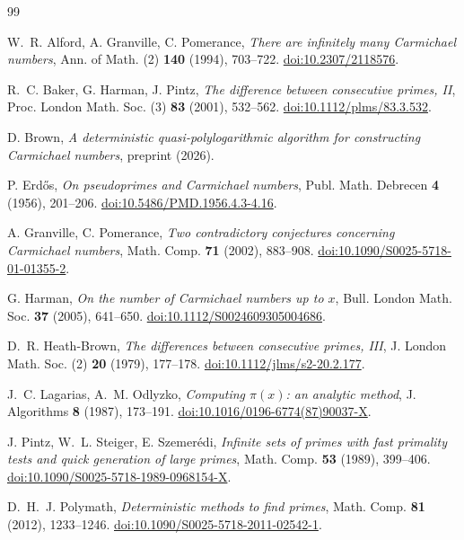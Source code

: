 \documentclass[11pt]{amsart}
\begin{document}
\begin{thebibliography}{99}

 W.~R. Alford, A. Granville, C. Pomerance,
\emph{There are infinitely many Carmichael numbers},
Ann. of Math. (2) \textbf{140} (1994), 703--722.
\href{https://doi.org/10.2307/2118576}{doi:10.2307/2118576}.

 R.~C. Baker, G. Harman, J. Pintz,
\emph{The difference between consecutive primes, II},
Proc. London Math. Soc. (3) \textbf{83} (2001), 532--562.
\href{https://doi.org/10.1112/plms/83.3.532}{doi:10.1112/plms/83.3.532}.

 D. Brown,
\emph{A deterministic quasi-polylogarithmic algorithm for constructing
Carmichael numbers}, preprint (2026).

 P. Erd\H{o}s,
\emph{On pseudoprimes and Carmichael numbers},
Publ. Math. Debrecen \textbf{4} (1956), 201--206.
\href{https://doi.org/10.5486/PMD.1956.4.3-4.16}{doi:10.5486/PMD.1956.4.3-4.16}.

 A. Granville, C. Pomerance,
\emph{Two contradictory conjectures concerning Carmichael numbers},
Math. Comp. \textbf{71} (2002), 883--908.
\href{https://doi.org/10.1090/S0025-5718-01-01355-2}{doi:10.1090/S0025-5718-01-01355-2}.

 G. Harman,
\emph{On the number of Carmichael numbers up to $x$},
Bull. London Math. Soc. \textbf{37} (2005), 641--650.
\href{https://doi.org/10.1112/S0024609305004686}{doi:10.1112/S0024609305004686}.

 D.~R. Heath-Brown,
\emph{The differences between consecutive primes, III},
J. London Math. Soc. (2) \textbf{20} (1979), 177--178.
\href{https://doi.org/10.1112/jlms/s2-20.2.177}{doi:10.1112/jlms/s2-20.2.177}.

 J.~C. Lagarias, A.~M. Odlyzko,
\emph{Computing $\pi(x)$: an analytic method},
J. Algorithms \textbf{8} (1987), 173--191.
\href{https://doi.org/10.1016/0196-6774(87)90037-X}{doi:10.1016/0196-6774(87)90037-X}.

 J. Pintz, W.~L. Steiger, E. Szemer\'edi,
\emph{Infinite sets of primes with fast primality tests and quick generation
of large primes}, Math. Comp. \textbf{53} (1989), 399--406.
\href{https://doi.org/10.1090/S0025-5718-1989-0968154-X}{doi:10.1090/S0025-5718-1989-0968154-X}.

 D.~H.~J. Polymath,
\emph{Deterministic methods to find primes},
Math. Comp. \textbf{81} (2012), 1233--1246.
\href{https://doi.org/10.1090/S0025-5718-2011-02542-1}{doi:10.1090/S0025-5718-2011-02542-1}.


\end{thebibliography}
\end{document}
